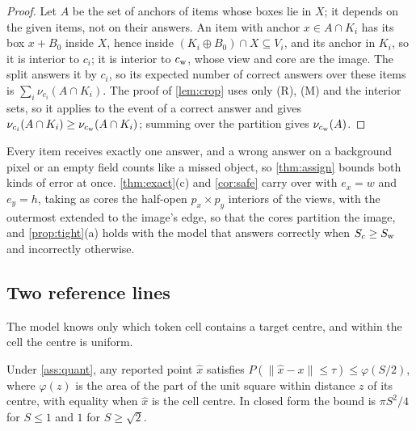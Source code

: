 \begin{proof}
Let $A$ be the set of anchors of items whose boxes lie in $X$; it depends on the given items, not on their answers. An item with anchor $x \in A \cap K_i$ has its box $x + B_0$ inside $X$, hence inside $(K_i \oplus B_0) \cap X \subseteq V_i$, and its anchor in $K_i$, so it is interior to $c_i$; it is interior to $c_{\mathrm{w}}$, whose view and core are the image. The split answers it by $c_i$, so its expected number of correct answers over these items is $\sum_i \nu_{c_i}(A \cap K_i)$. The proof of \cref{lem:crop} uses only (R), (M) and the interior sets, so it applies to the event of a correct answer and gives $\nu_{c_i}(A \cap K_i) \ge \nu_{c_{\mathrm{w}}}(A \cap K_i)$; summing over the partition gives $\nu_{c_{\mathrm{w}}}(A)$.
\end{proof}

Every item receives exactly one answer, and a wrong answer on a background pixel or an empty field counts like a missed object, so \cref{thm:assign} bounds both kinds of error at once. \cref{thm:exact}(c) and \cref{cor:safe} carry over with $e_x = w$ and $e_y = h$, taking as cores the half-open $p_x \times p_y$ interiors of the views, with the outermost extended to the image's edge, so that the cores partition the image, and \cref{prop:tight}(a) holds with the model that answers correctly when $S_c \ge S_{\mathrm{w}}$ and incorrectly otherwise.

\subsection{Two reference lines}
\label{sec:proofs-ref}

\begin{assumption}
\label{ass:quant}
The model knows only which token cell contains a target centre, and within the cell the centre is uniform.
\end{assumption}

\begin{proposition}
\label{prop:loc}
Under \cref{ass:quant}, any reported point $\hat{x}$ satisfies $P(\lVert \hat{x} - x \rVert \le \tau) \le \varphi(S/2)$, where $\varphi(z)$ is the area of the part of the unit square within distance $z$ of its centre, with equality when $\hat{x}$ is the cell centre. In closed form the bound is $\pi S^2/4$ for $S \le 1$ and $1$ for $S \ge \sqrt{2}$.
\end{proposition}

